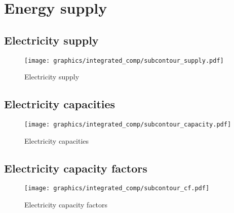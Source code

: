 
\clearpage

\section{Energy supply}
\subsection{Electricity supply}
\label{subsec:el-supply}

\begin{figure}[h]
    \centering
    \texttt{[image: graphics/integrated\_comp/subcontour\_supply.pdf]}
    \caption{Electricity supply}
    \label{fig:supply}
\end{figure}

\subsection{Electricity capacities}
\label{subsec:el-cap}

\begin{figure}[h]
    \centering
    \texttt{[image: graphics/integrated\_comp/subcontour\_capacity.pdf]}
    \caption{Electricity capacities}
    \label{fig:el-cap}
\end{figure}

\subsection{Electricity capacity factors}
\label{subsec:el-cf}

\begin{figure}[h]
    \centering
    \texttt{[image: graphics/integrated\_comp/subcontour\_cf.pdf]}
    \caption{Electricity capacity factors}
    \label{fig:el_cf}
\end{figure}







